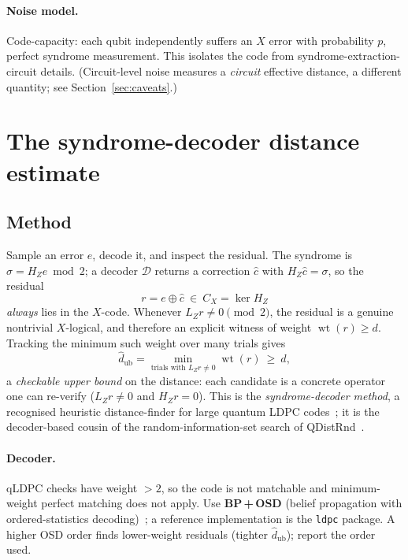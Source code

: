 \documentclass[11pt]{article}
\DeclareMathOperator{\wt}{wt}
\newcommand{\HZ}{H_Z}
\newcommand{\dub}{\hat d_{\mathrm{ub}}}
\begin{document}
\paragraph{Noise model.} Code-capacity: each qubit independently suffers an $X$
error with probability $p$, perfect syndrome measurement. This isolates the code
from syndrome-extraction-circuit details. (Circuit-level noise measures a
\emph{circuit} effective distance, a different quantity;
see Section~\ref{sec:caveats}.)

\section{The syndrome-decoder distance estimate}
\label{sec:syndrome}

\subsection{Method}
Sample an error $e$, decode it, and inspect the residual. The syndrome is
$\sigma=\HZ e\bmod 2$; a decoder $\mathcal D$ returns a correction $\hat c$ with
$\HZ\hat c=\sigma$, so the residual
\begin{equation}
  r=e\oplus\hat c\ \in\ C_X=\ker\HZ
\end{equation}
\emph{always} lies in the $X$-code. Whenever $L_Z r\neq 0\pmod 2$, the residual is
a genuine nontrivial $X$-logical, and therefore an explicit witness of weight
$\wt(r)\ge d$. Tracking the minimum such weight over many trials gives
\begin{equation}
  \dub=\min_{\text{trials with }L_Z r\neq 0}\wt(r)\ \ge\ d,
  \label{eq:dub}
\end{equation}
a \emph{checkable upper bound} on the distance: each candidate is a concrete
operator one can re-verify ($L_Z r\neq0$ and $\HZ r=0$). This is the
\emph{syndrome-decoder method}, a recognised heuristic distance-finder for large
quantum LDPC codes~\cite{Survey,RoffeBPOSD}; it is the decoder-based cousin of the
random-information-set search of QDistRnd~\cite{QDistRnd}.

\paragraph{Decoder.} qLDPC checks have weight $>2$, so the code is not matchable
and minimum-weight perfect matching does not apply. Use \textbf{BP\,+\,OSD}
(belief propagation with ordered-statistics decoding)~\cite{RoffeBPOSD,PanteleevKalachev};
a reference implementation is the \texttt{ldpc} package. A higher OSD order finds
lower-weight residuals (tighter $\dub$); report the order used.
\end{document}
